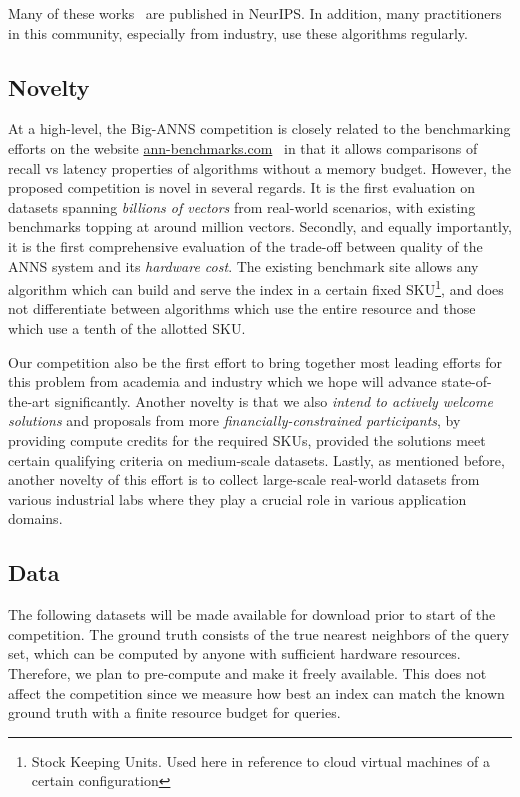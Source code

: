 Many of these
works~\cite{kulis2009learning,Shrivastava014,DiskANN19,hm-ann20} are
published in NeurIPS.  In addition, many practitioners in this
community, especially from industry, use these algorithms regularly.



\subsection{Novelty}
At a high-level, the Big-ANNS competition is closely related to the
benchmarking efforts on the website \url{ann-benchmarks.com}~\cite{Benchmark} in that it allows comparisons of
recall vs latency properties of algorithms without a memory
budget. However, the proposed competition is novel in several
regards. It is the first evaluation on datasets spanning
\emph{billions of vectors} from real-world scenarios, with existing
benchmarks topping at around million vectors. Secondly, and equally
importantly, it is the first comprehensive evaluation of the trade-off
between quality of the ANNS system and its \emph{hardware cost}. The
existing benchmark site allows any algorithm which can build and serve
the index in a certain fixed SKU\footnote{Stock Keeping Units. Used here in reference to cloud virtual machines of a certain configuration}, and does not differentiate between
algorithms which use the entire resource and those which use a tenth
of the allotted SKU.

Our competition also be the first effort to bring together most
leading efforts for this problem from academia and industry which we
hope will advance state-of-the-art significantly. Another novelty is
that we also \emph{intend to actively welcome solutions} and proposals
from more \emph{financially-constrained participants}, by providing
compute credits for the required SKUs, provided the solutions meet
certain qualifying criteria on medium-scale datasets. Lastly, as
mentioned before, another novelty of this effort is to collect
large-scale real-world datasets from various industrial labs where
they play a crucial role in various application domains.



\subsection{Data}
The following datasets will be made available for download prior to
start of the competition. The ground truth consists of the true
nearest neighbors of the query set, which can be computed by anyone
with sufficient hardware resources. Therefore, we plan to pre-compute and make it
freely available.  This does not affect the competition since we
measure how best an index can match the known ground truth with a
finite resource budget for queries.

